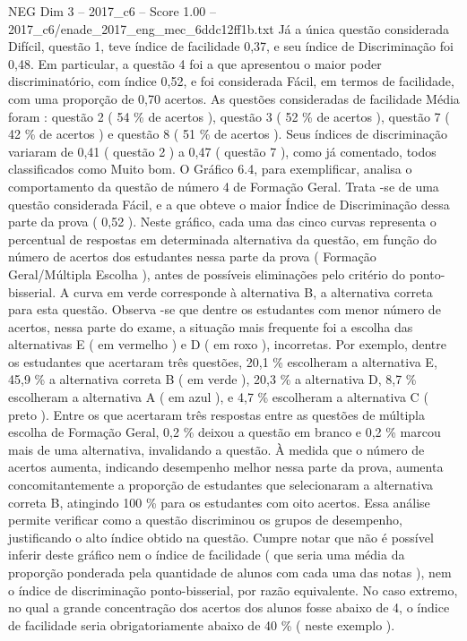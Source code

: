 \begin{textsample}{NEG Dim 3 – 2017\_c6 – Score 1.00 – 2017\_c6/enade\_2017\_eng\_mec\_6ddc12ff1b.txt}
Já a única questão considerada Difícil, questão 1, teve índice de facilidade 0,37, e seu índice de Discriminação foi 0,48.
Em particular, a questão 4 foi a que apresentou o maior poder discriminatório, com índice 0,52, e foi considerada Fácil, em termos de facilidade, com uma proporção de 0,70 acertos.
As questões consideradas de facilidade Média foram : questão 2 ( 54 \% de acertos ), questão 3 ( 52 \% de acertos ), questão 7 ( 42 \% de acertos ) e questão 8 ( 51 \% de acertos ).
Seus índices de discriminação variaram de 0,41 ( questão 2 ) a 0,47 ( questão 7 ), como já comentado, todos classificados como Muito bom.
O Gráfico 6.4, para exemplificar, analisa o comportamento da questão de número 4 de Formação Geral.
Trata -se de uma questão considerada Fácil, e a que obteve o maior Índice de Discriminação dessa parte da prova ( 0,52 ).
Neste gráfico, cada uma das cinco curvas representa o percentual de respostas em determinada alternativa da questão, em função do número de acertos dos estudantes nessa parte da prova ( Formação Geral/Múltipla Escolha ), antes de possíveis eliminações pelo critério do ponto-bisserial.
A curva em verde corresponde à alternativa B, a alternativa correta para esta questão.
Observa -se que dentre os estudantes com menor número de acertos, nessa parte do exame, a situação mais frequente foi a escolha das alternativas E ( em vermelho ) e D ( em roxo ), incorretas.
Por exemplo, dentre os estudantes que acertaram três questões, 20,1 \% escolheram a alternativa E, 45,9 \% a alternativa correta B ( em verde ), 20,3 \% a alternativa D, 8,7 \% escolheram a alternativa A ( em azul ), e 4,7 \% escolheram a alternativa C ( preto ).
Entre os que acertaram três respostas entre as questões de múltipla escolha de Formação Geral, 0,2 \% deixou a questão em branco e 0,2 \% marcou mais de uma alternativa, invalidando a questão.
À medida que o número de acertos aumenta, indicando desempenho melhor nessa parte da prova, aumenta concomitantemente a proporção de estudantes que selecionaram a alternativa correta B, atingindo 100 \% para os estudantes com oito acertos.
Essa análise permite verificar como a questão discriminou os grupos de desempenho, justificando o alto índice obtido na questão.
Cumpre notar que não é possível inferir deste gráfico nem o índice de facilidade ( que seria uma média da proporção ponderada pela quantidade de alunos com cada uma das notas ), nem o índice de discriminação ponto-bisserial, por razão equivalente.
No caso extremo, no qual a grande concentração dos acertos dos alunos fosse abaixo de 4, o índice de facilidade seria obrigatoriamente abaixo de 40 \% ( neste exemplo ).

\end{textsample}
